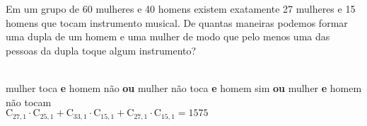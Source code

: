 \begin{ex}
Em um grupo de 60 mulheres e 40 homens existem exatamente 27 mulheres e 15 homens que tocam instrumento musical. De quantas maneiras podemos formar uma dupla de um homem e uma mulher de modo que pelo menos uma das pessoas da dupla toque algum instrumento? 
  \begin{sol}
    \phantom{A}  \\
    mulher toca \textbf{e} homem não \textbf{ou} mulher não toca \textbf{e} homem sim \textbf{ou} mulher \textbf{e} homem não tocam\\
    $\mathrm{C}_{{27},1}\cdot\mathrm{C}_{{25},1}+\mathrm{C}_{{33},1}\cdot\mathrm{C}_{{15},1}+\mathrm{C}_{{27},1}\cdot\mathrm{C}_{{15},1}=1575$
  \end{sol}
\end{ex}